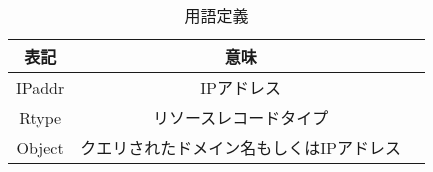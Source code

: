 \begin{table}[htb]
 \caption{用語定義}
 \centering
  \begin{tabular}{ccc}
    \toprule
    表記 & 意味 \\
    \midrule
    IPaddr & IPアドレス \\
    Rtype & リソースレコードタイプ \\
    Object & クエリされたドメイン名もしくはIPアドレス
    \bottomrule
  \end{tabular}
 \label{tab:terminology}
\end{table}
